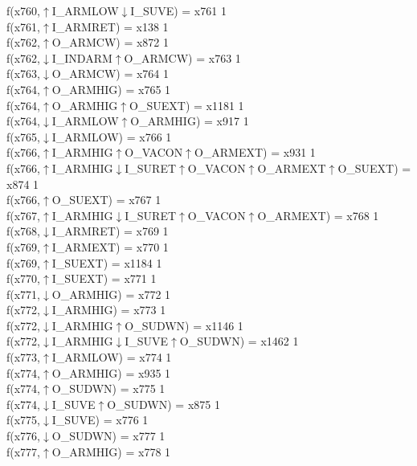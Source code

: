 f(x760,$\uparrow$I\_ARMLOW$\downarrow$I\_SUVE) = x761 {1} \\
f(x761,$\uparrow$I\_ARMRET) = x138 {1} \\
f(x762,$\uparrow$O\_ARMCW) = x872 {1} \\
f(x762,$\downarrow$I\_INDARM$\uparrow$O\_ARMCW) = x763 {1} \\
f(x763,$\downarrow$O\_ARMCW) = x764 {1} \\
f(x764,$\uparrow$O\_ARMHIG) = x765 {1} \\
f(x764,$\uparrow$O\_ARMHIG$\uparrow$O\_SUEXT) = x1181 {1} \\
f(x764,$\downarrow$I\_ARMLOW$\uparrow$O\_ARMHIG) = x917 {1} \\
f(x765,$\downarrow$I\_ARMLOW) = x766 {1} \\
f(x766,$\uparrow$I\_ARMHIG$\uparrow$O\_VACON$\uparrow$O\_ARMEXT) = x931 {1} \\
f(x766,$\uparrow$I\_ARMHIG$\downarrow$I\_SURET$\uparrow$O\_VACON$\uparrow$O\_ARMEXT$\uparrow$O\_SUEXT) = x874 {1} \\
f(x766,$\uparrow$O\_SUEXT) = x767 {1} \\
f(x767,$\uparrow$I\_ARMHIG$\downarrow$I\_SURET$\uparrow$O\_VACON$\uparrow$O\_ARMEXT) = x768 {1} \\
f(x768,$\downarrow$I\_ARMRET) = x769 {1} \\
f(x769,$\uparrow$I\_ARMEXT) = x770 {1} \\
f(x769,$\uparrow$I\_SUEXT) = x1184 {1} \\
f(x770,$\uparrow$I\_SUEXT) = x771 {1} \\
f(x771,$\downarrow$O\_ARMHIG) = x772 {1} \\
f(x772,$\downarrow$I\_ARMHIG) = x773 {1} \\
f(x772,$\downarrow$I\_ARMHIG$\uparrow$O\_SUDWN) = x1146 {1} \\
f(x772,$\downarrow$I\_ARMHIG$\downarrow$I\_SUVE$\uparrow$O\_SUDWN) = x1462 {1} \\
f(x773,$\uparrow$I\_ARMLOW) = x774 {1} \\
f(x774,$\uparrow$O\_ARMHIG) = x935 {1} \\
f(x774,$\uparrow$O\_SUDWN) = x775 {1} \\
f(x774,$\downarrow$I\_SUVE$\uparrow$O\_SUDWN) = x875 {1} \\
f(x775,$\downarrow$I\_SUVE) = x776 {1} \\
f(x776,$\downarrow$O\_SUDWN) = x777 {1} \\
f(x777,$\uparrow$O\_ARMHIG) = x778 {1} \\
